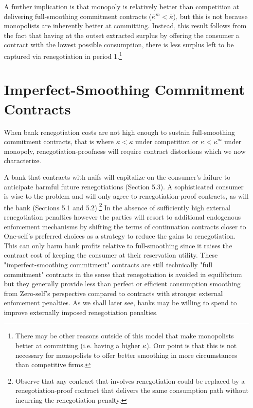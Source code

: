 \documentclass[11pt,english]{article}
\theoremstyle{plain}
\theoremstyle{definition}
\begin{document}
A further implication is that monopoly is relatively better than competition at delivering full-smoothing
commitment contracts ($\bar{\kappa}^{m}<\bar{\kappa}$),
but this is not because monopolists are inherently better at committing. Instead,
this result follows from the fact that having at the outset extracted
surplus by offering the consumer a contract with the lowest possible
consumption, there is less surplus left to be captured
via renegotiation in period 1.\footnote{There may be other reasons outside of this model that make monopolists
better at committing (i.e. having a higher $\kappa$). Our point is
that this is not necessary for monopolists to offer better smoothing
in more circumstances than competitive firms.}

\section{Imperfect-Smoothing Commitment Contracts }

\label{sec:imperfectK}

When bank renegotiation costs are not high enough to sustain full-smoothing
commitment contracts, that is where $\kappa<\bar{\kappa}$ under competition
or $\kappa<\bar{\kappa}^{m}$ under monopoly, renegotiation-proofness
will require contract distortions which we now characterize.

A bank that contracts with naifs will capitalize on the consumer's
failure to anticipate harmful future renegotiations (Section 5.3).
A sophisticated consumer is wise to the problem and will only agree
to renegotiation-proof contracts, as will the bank (Sections 5.1 and 5.2).\footnote{Observe that any contract that involves renegotiation could be replaced by a renegotiation-proof contract that delivers the same consumption path without incurring the renegotiation penalty.} In the absence
of sufficiently high external renegotiation penalties however the
parties will resort to additional endogenous enforcement mechanisms
by shifting the terms of continuation contracts closer to One-self's
preferred choices as a strategy to reduce the gains to renegotiation. This can only harm bank profits relative to full-smoothing since it raises the contract cost of
keeping the consumer at their reservation utility.
These "imperfect-smoothing commitment" contracts are
still technically "full commitment" contracts in the sense that renegotiation
is avoided in equilibrium but they generally provide less than perfect
or efficient consumption smoothing from Zero-self's perspective compared
to contracts with stronger external enforcement penalties. As we
shall later see, banks may be willing to spend to improve externally imposed renegotiation
penalties.
\end{document}
